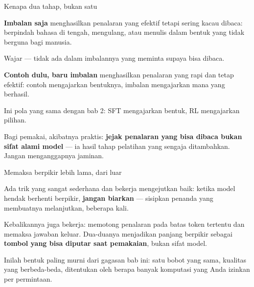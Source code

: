 \documentclass[aspectratio=169,11pt,t]{beamer}
\begin{document}
\begin{frame}[shrink=25]{Kenapa dua tahap, bukan satu}
\begin{minipage}[t]{0.485\textwidth}
{\fontsize{9.4}{12.6}\selectfont\color{fg2}\textbf{Imbalan saja} menghasilkan penalaran yang efektif tetapi sering kacau dibaca: berpindah bahasa di tengah, mengulang, atau menulis dalam bentuk yang tidak berguna bagi manusia.\par}\vskip 4pt
{\fontsize{9.4}{12.6}\selectfont\color{fg2}Wajar --- tidak ada dalam imbalannya yang meminta supaya bisa dibaca.\par}\vskip 4pt

\end{minipage}%
\hfill
\begin{minipage}[t]{0.485\textwidth}
{\fontsize{9.4}{12.6}\selectfont\color{fg2}\textbf{Contoh dulu, baru imbalan} menghasilkan penalaran yang rapi dan tetap efektif: contoh mengajarkan bentuknya, imbalan mengajarkan mana yang berhasil.\par}\vskip 4pt
{\fontsize{9.4}{12.6}\selectfont\color{fg2}Ini pola yang sama dengan bab 2: SFT mengajarkan bentuk, RL mengajarkan pilihan.\par}\vskip 4pt

\end{minipage}%
\begin{iband}[signal]
Bagi pemakai, akibatnya praktis: \textbf{jejak penalaran yang bisa dibaca bukan sifat alami model} --- ia hasil tahap pelatihan yang sengaja ditambahkan. Jangan menganggapnya jaminan.
\end{iband}
\end{frame}

\begin{frame}[shrink=25]{Memaksa berpikir lebih lama, dari luar}
{\fontsize{9.4}{12.6}\selectfont\color{fg2}Ada trik yang sangat sederhana dan bekerja mengejutkan baik: ketika model hendak berhenti berpikir, \textbf{jangan biarkan} --- sisipkan penanda yang membuatnya melanjutkan, beberapa kali.\par}\vskip 4pt
{\fontsize{9.4}{12.6}\selectfont\color{fg2}Kebalikannya juga bekerja: memotong penalaran pada batas token tertentu dan memaksa jawaban keluar. Dua-duanya menjadikan panjang berpikir sebagai \textbf{tombol yang bisa diputar saat pemakaian}, bukan sifat model.\par}\vskip 4pt
\begin{iband}[signal]
Inilah bentuk paling murni dari gagasan bab ini: satu bobot yang sama, kualitas yang berbeda-beda, ditentukan oleh berapa banyak komputasi yang Anda izinkan per permintaan.
\end{iband}
\end{frame}
\end{document}
